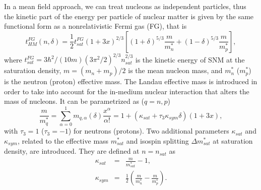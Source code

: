 In a mean field approach, we can treat nucleons as independent
particles, thus the kinetic part of the energy per particle of nuclear matter 
is given by the same functional form as a nonrelativistic Fermi gas (FG), that 
is
%
\begin{equation}
  t_{HM}^{FG}(n,\delta) =
  \frac{1}{2}t_{sat}^{FG}(1+3x)^{2/3}\left[(1+\delta)^{5/3}\frac{m}{m_n^*} +
  (1-\delta)^{5/3}\frac{m}{m_p^*}\right],
\end{equation}
%
where $t_{sat}^{FG} = 3\hbar^2/(10m)(3\pi^2/2)^{2/3}n_{sat}^{2/3}$ is the
kinetic energy of SNM at the saturation density, $m = (m_n + m_p)/2$ is the
mean nucleon mass, and $m_n^*$ ($m_p^*$) is the neutron (proton) effective
mass. The Landau effective mass is introduced in order to take into account for 
the in-medium nuclear interaction that alters the mass of nucleons. It can be
parametrized as ($q=n,p$)
%
\begin{equation}
  \frac{m}{m_q^*} = \sum_{\alpha=0}^1
  m_{q,\alpha}(\delta)\frac{x^\alpha}{\alpha!}
  = 1 + (\kappa_{sat} + \tau_3\kappa_{sym}\delta)(1+3x),
\end{equation}
%
with $\tau_3 = 1$ ($\tau_3 = -1$) for neutrons (protons).
Two additional parameters $\kappa_{sat}$ and $\kappa_{sym}$, related to the 
effective mass $m_{sat}^*$ and isospin splitting $\Delta m_{sat}^*$ at 
saturation density, are introduced. They are defined at $n = n_{sat}$ as
%
\begin{eqnarray}
  \kappa_{sat} &=& \frac{m}{m_{sat}^*} - 1,\\
  \kappa_{sym} &=& \frac{1}{2}\left(\frac{m}{m_n^*} - \frac{m}{m_p^*}\right).
\end{eqnarray}
%


